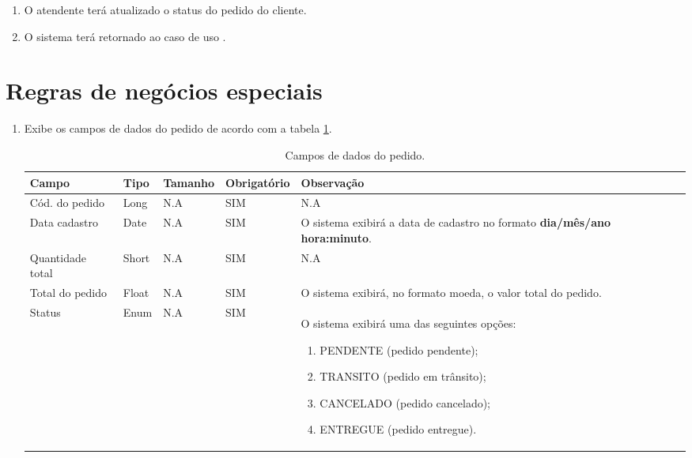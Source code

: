 \begin{enumerate}
	\item O atendente terá atualizado o status do pedido do cliente.
	\item O sistema terá retornado ao caso de uso .	
\end{enumerate}

\section{Regras de negócios especiais}

\begin{enumerate}[label=RN\arabic*]
	\item Exibe os campos de dados do pedido de acordo com a tabela \ref{uc009_tb_rn1}. \label{uc009_rn:1}
	\begin{table}[htb]
		\ABNTEXfontereduzida
		\caption[Campos de dados do pedido]{Campos de dados do pedido.}
		\label{uc009_tb_rn1}
		\begin{tabular}{|p{3.0cm}|p{2.0cm}|p{1.5cm}|p{2.0cm}|p{5.75cm}|}
			\hline
			\textbf{Campo}   & \textbf{Tipo} & \textbf{Tamanho} & \textbf{Obrigatório} & \textbf{Observação}                                                                                                                                              \\ \hline
			Cód. do pedido   & Long          & N.A & SIM & N.A                                                                                                                                                              \\ \hline
			Data cadastro    & Date          & N.A & SIM & O sistema exibirá a data de cadastro no formato \textbf{dia/mês/ano hora:minuto}.                                                                                \\ \hline
			Quantidade total & Short         & N.A & SIM & N.A                                                                                                                                                              \\ \hline
			Total do pedido  & Float         & N.A & SIM & O sistema exibirá, no formato moeda, o valor total do pedido.                                                                                                    \\ \hline
			Status           & Enum          & N.A & SIM & O sistema exibirá uma das seguintes opções: 	
			\begin{enumerate}
				\item PENDENTE (pedido pendente);
				\item TRANSITO (pedido em trânsito);
				\item CANCELADO (pedido cancelado);
				\item ENTREGUE (pedido entregue).
			\end{enumerate}\\ \hline
		\end{tabular}
	\end{table}
\end{enumerate}